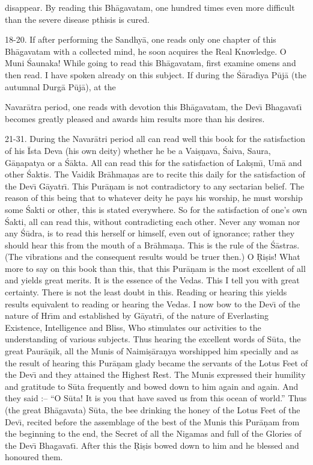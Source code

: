 disappear. By reading this Bh\=agavatam, one hundred times even more difficult than the severe disease pthisis is cured.

18-20. If after performing the Sandhy\=a, one reads only one chapter of this Bh\=agavatam with a collected mind, he soon acquires the Real Knowledge. O Muni \'Saunaka! While going to read this Bh\=agavatam, first examine omens and then read. I have spoken already on this subject. If during the \'S\=arad\={\i}ya P\=uj\=a (the autumnal Durg\=a P\=uj\=a), at the

Navar\=atra period, one reads with devotion this Bh\=agavatam, the Dev\={\i} Bhagavat\={\i} becomes greatly pleased and awards him results more than his desires.

21-31. During the Navar\=atri period all can read well this book for the satisfaction of his \=Ista Deva (his own deity) whether he be a Vai\d{s}\d{n}ava, \'Saiva, Saura, G\=a\d{n}apatya or a \'S\=akta. All can read this for the satisfaction of Lak\d{s}m\={\i}, Um\=a and other \'Saktis. The Vaidik Br\=ahma\d{n}as are to recite this daily for the satisfaction of the Dev\={\i} G\=ayatr\={\i}. This Pur\=a\d{n}am is not contradictory to any sectarian belief. The reason of this being that to whatever deity he pays his worship, he must worship some \'Sakti or other, this is stated everywhere. So for the satisfaction of one's own \'Sakti, all can read this, without contradicting each other. Never any woman nor any \'S\=udra, is to read this herself or himself, even out of ignorance; rather they should hear this from the mouth of a Br\=ahma\d{n}a. This is the rule of the \'S\=astras. (The vibrations and the consequent results would be truer then.) O \d{R}i\d{s}is! What more to say on this book than this, that this Pur\=a\d{n}am is the most excellent of all and yields great merits. It is the essence of the Vedas. This I tell you with great certainty. There is not the least doubt in this. Reading or hearing this yields results equivalent to reading or hearing the Vedas. I now bow to the Dev\={\i} of the nature of Hr\={\i}m and established by G\=ayatr\={\i}, of the nature of Everlasting Existence, Intelligence and Bliss, Who stimulates our activities to the understanding of various subjects. Thus hearing the excellent words of S\=uta, the great Paur\=a\d{n}ik, all the Munis of Naimi\d{s}\=ara\d{n}ya worshipped him specially and as the result of hearing this Pur\=a\d{n}am glady became the servants of the Lotus Feet of the Dev\={\i} and they attained the Highest Rest. The Munis expressed their humility and gratitude to S\=uta frequently and bowed down to him again and again. And they said :-- ``O S\=uta! It is you that have saved us from this ocean of world.'' Thus (the great Bh\=agavata) S\=uta, the bee drinking the honey of the Lotus Feet of the Dev\={\i}, recited before the assemblage of the best of the Munis this Pur\=a\d{n}am from the beginning to the end, the Secret of all the Nigamas and full of the Glories of the Dev\={\i} Bhagavat\={\i}. After this the \d{R}i\d{s}is bowed down to him and he blessed and honoured them.

